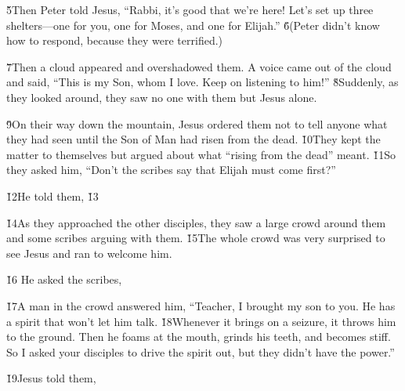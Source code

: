 \v{5}Then Peter told Jesus, ``Rabbi, it's good that we're here! Let's set up three shelters---one for you, one for Moses, and one for Elijah.'' \v{6}(Peter didn't know how to respond, because they were terrified.)

\v{7}Then a cloud appeared and overshadowed them. A voice came out of the cloud and said, ``This is my Son, whom I love. Keep on listening to him!'' \v{8}Suddenly, as they looked around, they saw no one with them but Jesus alone.

\v{9}On their way down the mountain, Jesus ordered them not to tell anyone what they had seen until the Son of Man had risen from the dead. \v{10}They kept the matter to themselves but argued about what ``rising from the dead'' meant. \v{11}So they asked him, ``Don't the scribes say that Elijah must come first?''

\v{12}He told them,  \v{13}

\v{14}As they approached the other disciples, they saw a large crowd around them and some scribes arguing with them. \v{15}The whole crowd was very surprised to see Jesus and ran to welcome him.

\v{16} He asked the scribes, 

\v{17}A man in the crowd answered him, ``Teacher, I brought my son to you. He has a spirit that won't let him talk. \v{18}Whenever it brings on a seizure, it throws him to the ground. Then he foams at the mouth, grinds his teeth, and becomes stiff. So I asked your disciples to drive the spirit out, but they didn't have the power.''

\v{19}Jesus told them, 


